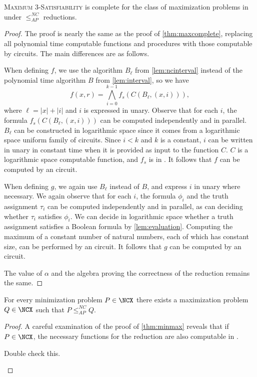 \documentclass[]{article}
\newcommand{\NCAPr}{\leq_{AP}^{NC}}
\begin{document}
\begin{theorem}\label{thm:ncmaxcomplete}
  \textsc{Maximum 3-Satisfiability} is complete for the class of maximization problems in \NCX{} under $\NCAPr$ reductions.
\end{theorem}
\begin{proof}
  The proof is nearly the same as the proof of \autoref{thm:maxcomplete}, replacing all polynomial time computable functions and procedures with those computable by \NC{} circuits.
  The main differences are as follows.

  When defining $f$, we use the \NC{} algorithm $B_\ell$ from \autoref{lem:ncinterval} instead of the polynomial time algorithm $B$ from \autoref{lem:interval}, so we have
  \begin{displaymath}
    f(x, r) = \bigwedge_{i = 0}^{k - 1}{f_s(C(B_\ell, (x, i)))},
  \end{displaymath}
  where $\ell = |x| + |i|$ and $i$ is expressed in unary.
  Observe that for each $i$, the formula $f_s(C(B_\ell, (x, i)))$ can be computed independently and in parallel.
  $B_\ell$ can be constructed in logarithmic space since it comes from a logarithmic space uniform family of circuits.
  Since $i < k$ and $k$ is a constant, $i$ can be written in unary in constant time when it is provided as input to the function $C$.
  $C$ is a logarithmic space computable function, and $f_s$ is in \NC.
  It follows that $f$ can be computed by an \NC{} circuit.

  When defining $g$, we again use $B_\ell$ instead of $B$, and express $i$ in unary where necessary.
  We again observe that for each $i$, the formula $\phi_i$ and the truth assignment $\tau_i$ can be computed independently and in parallel, as can deciding whether $\tau_i$ satisfies $\phi_i$.
  We can decide in logarithmic space whether a truth assignment satisfies a Boolean formula by \autoref{lem:evaluation}.
  Computing the maximum of a constant number of natural numbers, each of which has constant size, can be performed by an \NC{} circuit.
  It follows that $g$ can be computed by an \NC{} circuit.

  The value of $\alpha$ and the algebra proving the correctness of the reduction remains the same.
\end{proof}

\begin{theorem}\label{thm:ncminmax}
  For every minimization problem $P \in \NCX$ there exists a maximization problem $Q \in \NCX$ such that $P \NCAPr Q$.
\end{theorem}
\begin{proof}
  A careful examination of the proof of \autoref{thm:minmax} reveals that if $P \in \NCX$, the necessary functions for the reduction are also computable in \NC.
  \begin{todo}
    Double check this.
  \end{todo}
\end{proof}
\end{document}

